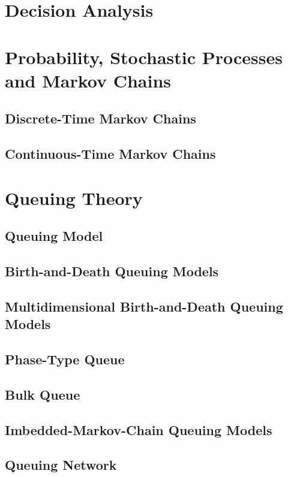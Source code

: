 \documentclass[10pt]{book}
\begin{document}
	\part{Decision Analysis}

	\part{Probability, Stochastic Processes and Markov Chains}
		\chapter{Discrete-Time Markov Chains}

		\chapter{Continuous-Time Markov Chains}

	\part{Queuing Theory}
		\chapter{Queuing Model}

		\chapter{Birth-and-Death Queuing Models}

		\chapter{Multidimensional Birth-and-Death Queuing Models}

		\chapter{Phase-Type Queue}

		\chapter{Bulk Queue}

		\chapter{Imbedded-Markov-Chain Queuing Models}

		\chapter{Queuing Network}
\end{document}
